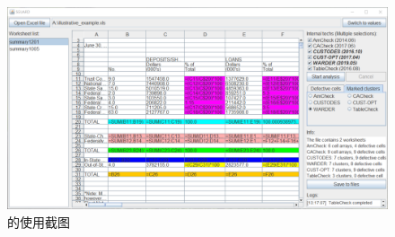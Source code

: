 \begin{figure}[tp]   
    \centering
    \includegraphics[width=\textwidth]{figure/figure11.png}
    \caption{\sg 的使用截图}
    \label{figure11}
\end{figure}
